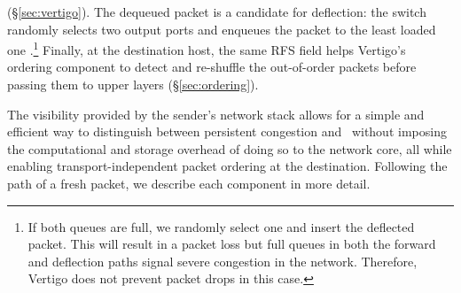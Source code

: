 (\S\ref{sec:vertigo}). The dequeued packet is a candidate for deflection: the switch randomly selects two output ports and enqueues the packet to the least loaded one .\footnote{If both queues are full, we randomly select one and insert the deflected packet. This will result in a packet loss but full queues in both the forward and deflection paths signal severe congestion in the network. Therefore, Vertigo does not prevent packet drops in this case.}
Finally, at the destination host, the same RFS field helps Vertigo's ordering component to detect and re-shuffle the out-of-order packets before passing them to upper layers  (\S\ref{sec:ordering}).

The visibility provided by the sender's network stack allows for a simple and efficient way to distinguish between persistent congestion and \bursts \ without imposing the computational and storage overhead of doing so to the network core, all while enabling transport-independent packet ordering at the destination.
Following the path of a fresh packet, we describe each component in more detail.

